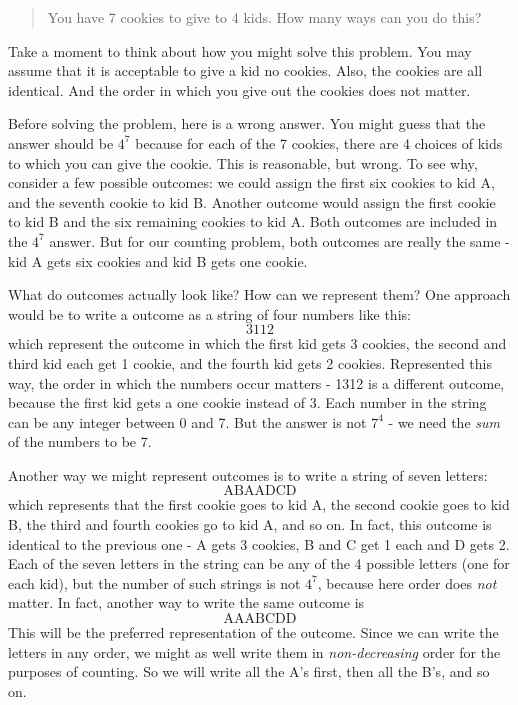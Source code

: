 \documentclass[12pt]{article}
\begin{document}
\begin{quote}
  You have 7 cookies to give to 4 kids.  How many ways can you do this?
\end{quote}

Take a moment to think about how you might solve this problem.  You may assume that it is acceptable to give a kid no cookies.  Also, the cookies are all identical.  And the order in which you give out the cookies does not matter.

Before solving the problem, here is a wrong answer.  You might guess that the answer should be $4^7$ because for each of the 7 cookies, there are 4 choices of kids to which you can give the cookie. This is reasonable, but wrong.  To see why, consider a few possible outcomes:  we could assign the first six cookies to kid A, and the seventh cookie to kid B.  Another outcome would assign the first cookie to kid B and the six remaining cookies to kid A.  Both outcomes are included in the $4^7$ answer.  But for our counting problem, both outcomes are really the same - kid A gets six cookies and kid B gets one cookie.

What do outcomes actually look like?  How can we represent them? One approach would be to write a outcome as a string of four numbers like this:
\[3112\]
which represent the outcome in which the first kid gets 3 cookies, the second and third kid each get 1 cookie, and the fourth kid gets 2 cookies.  Represented this way, the order in which the numbers occur matters - 1312 is a different outcome, because the first kid gets a one cookie instead of 3.  Each number in the string can be any integer between 0 and 7.  But the answer is not $7^4$ - we need the {\em sum} of the numbers to be 7.  

Another way we might represent outcomes is to write a string of seven letters:
\[\mbox{ABAADCD}\]
which represents that the first cookie goes to kid A, the second cookie goes to kid B, the third and fourth cookies go to kid A, and so on.  In fact, this outcome is identical to the previous one - A gets 3 cookies, B and C get 1 each and D gets 2.  Each of the seven letters in the string can be any of the 4 possible letters (one for each kid), but the number of such strings is not $4^7$, because here order does {\em not} matter.  In fact, another way to write the same outcome is
\[\mbox{AAABCDD}\]
This will be the preferred representation of the outcome.  Since we can write the letters in any order, we might as well write them in {\em non-decreasing} order for the purposes of counting.  So we will write all the A's first, then all the B's, and so on.  
\end{document}
